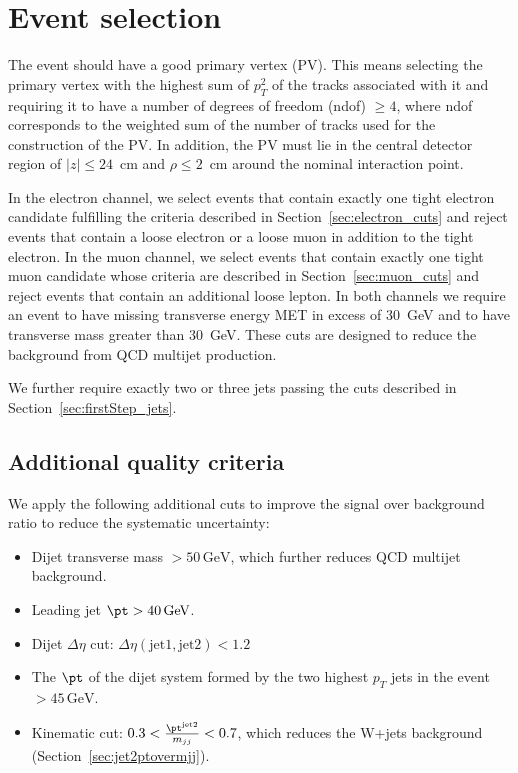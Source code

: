 \section{Event selection}
\label{sec:evtSel}
The event should have a good primary vertex (PV). This means selecting
the primary vertex with the highest sum of $p_{T}^2$ of the tracks
associated with it and requiring it to have a number of degrees of
freedom (ndof) $\ge 4$, where ndof corresponds to the weighted sum of
the number of tracks used for the construction of the PV. In addition,
the PV must lie in the central detector region of $|z| \le 24$~cm
and $\rho \le 2$~cm around the nominal interaction point.

\par
In the electron channel, we select events that contain exactly one
tight electron candidate fulfilling the criteria described in
Section~\ref{sec:electron_cuts} and reject events that contain a
loose electron or a loose muon in addition to the tight electron. 
In the muon channel, we select events that contain exactly one
tight muon candidate whose criteria are described in
Section~\ref{sec:muon_cuts} and reject events that contain an
additional loose lepton.
In both channels we require an event to have missing transverse energy
MET in excess of 30~GeV and to have transverse mass greater than
30~GeV.  These cuts are designed to reduce the background
from QCD multijet production.

We further require exactly two or three jets passing the cuts
described in Section~\ref{sec:firstStep_jets}.

\subsection{Additional quality criteria}
\label{sec:evtSelAdditionalCuts}
We apply the following additional cuts to improve 
the signal over background ratio to reduce the systematic 
uncertainty:
\begin{itemize}
\item 
Dijet transverse mass $ > 50\,\mathrm{GeV}$, which further reduces QCD multijet 
background.
\item 
Leading jet $\pt > 40\,\mathrm{GeV}$. 
\item 
Dijet $\Delta \eta$ cut: $\Delta\eta (\mathrm{jet1, jet2}) < 1.2$ 
\item 
The $\pt$ of the dijet system formed by the two highest $p_{T}$
jets in the event $ > 45\,\mathrm{GeV}$.
\item 
Kinematic cut: $0.3 < \frac{\pt^{\mathrm{jet2}}}{m_{jj}} < 0.7$, which
reduces the W+jets background (Section~\ref{sec:jet2ptovermjj}).
\end{itemize}
